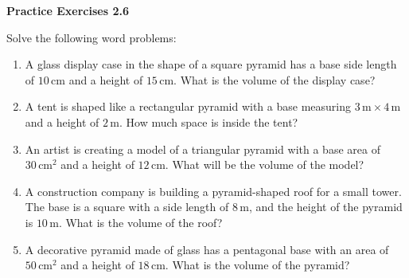  \vspace{1ex}
\noindent\textbf{Practice Exercises 2.6}

\vspace{0.75ex}

Solve the following word problems:

\begin{enumerate}[noitemsep, label = \color{blue}\arabic*. ]
    \item A glass display case in the shape of a square pyramid has a base side length of \(10 \, \text{cm}\) and a height of \(15 \, \text{cm}\). What is the volume of the display case?
    
    \item A tent is shaped like a rectangular pyramid with a base measuring \(3 \, \text{m} \times 4 \, \text{m}\) and a height of \(2 \, \text{m}\). How much space is inside the tent?
    
    \item An artist is creating a model of a triangular pyramid with a base area of \(30 \, \text{cm}^2\) and a height of \(12 \, \text{cm}\). What will be the volume of the model?
    
    \item A construction company is building a pyramid-shaped roof for a small tower. The base is a square with a side length of \(8 \, \text{m}\), and the height of the pyramid is \(10 \, \text{m}\). What is the volume of the roof?
    
    \item A decorative pyramid made of glass has a pentagonal base with an area of \(50 \, \text{cm}^2\) and a height of \(18 \, \text{cm}\). What is the volume of the pyramid?
    
    
    
    
    
\end{enumerate}
